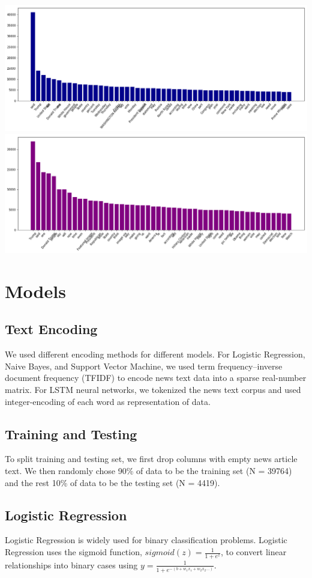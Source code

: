 \documentclass{article}
\begin{document}
\begin{multicols}{2}
\begin{center}
\includegraphics[scale=0.26]{images/freqreal.png}
\includegraphics[scale=0.26]{images/freqfake.png}
\end{center}

\section{Models}
\subsection{Text Encoding}
We used different encoding methods for different models. 
For Logistic Regression, Naive Bayes, and Support Vector Machine, we used term frequency–inverse document frequency (TFIDF) to encode news text data into a sparse real-number matrix. For LSTM neural networks, we tokenized the news text corpus and used integer-encoding of each word as representation of data.

\subsection{Training and Testing}
To split training and testing set, we first drop columns with empty news article text. We then randomly chose 90\% of data to be the training set (N = 39764) and the rest 10\% of data to be the testing set (N = 4419).

\subsection{Logistic Regression}
Logistic Regression is widely used for binary classification problems. Logistic Regression uses the sigmoid function, $sigmoid(z)=  \frac{1}{1+e^{z}}$, to convert linear relationships into binary cases using $y=\frac{1}{1+e^{-(b+w_1x_1+w_2x_2...)}}$. 


\end{multicols}
\end{document}
